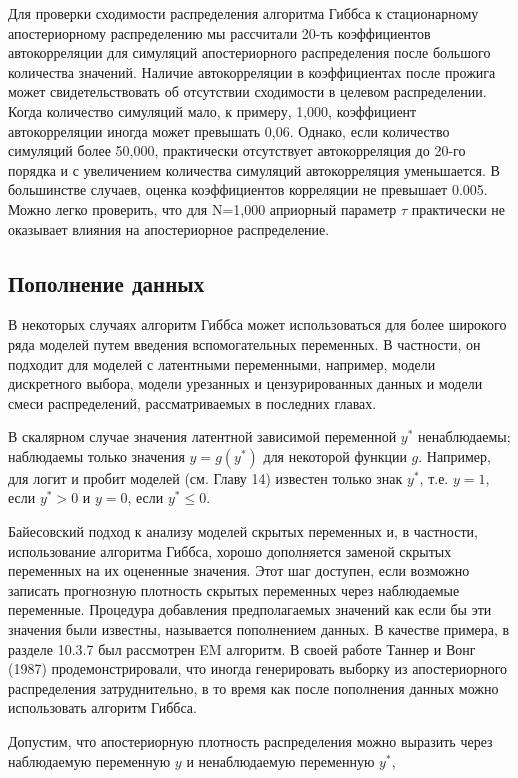 Для проверки сходимости распределения алгоритма Гиббса к стационарному апостериорному распределению мы рассчитали  20-ть коэффициентов автокорреляции для симуляций апостериорного распределения после большого количества значений. Наличие автокорреляции в коэффициентах после прожига может свидетельствовать об отсутствии сходимости в целевом распределении. Когда количество симуляций мало, к примеру, 1,000, коэффициент автокорреляции иногда может превышать 0,06. Однако, если количество симуляций более 50,000, практически отсутствует автокорреляция до 20-го порядка и с увеличением количества симуляций автокорреляция уменьшается. В большинстве случаев, оценка коэффициентов корреляции не превышает 0.005. Можно легко проверить, что для N=1,000  априорный параметр $\tau$ практически не оказывает влияния на апостериорное распределение.


\subsection{Пополнение данных}

В некоторых случаях алгоритм Гиббса может использоваться для более широкого ряда моделей путем введения вспомогательных переменных. В частности, он подходит для моделей с латентными переменными, например, модели дискретного выбора,  модели урезанных и цензурированных данных и модели  смеси распределений, рассматриваемых в последних главах.

В скалярном случае значения латентной зависимой переменной $y^{*}$ ненаблюдаемы; наблюдаемы только значения $y=g(y^{*})$ для  некоторой функции $g$. %
 Например, для логит и пробит моделей (см. Главу 14) известен только знак $y^{*}$, т.е. $y=1$, если $y^{*}>0$ и $y=0$, если $y^{*}{\leq}0$. 

Байесовский подход к анализу моделей скрытых переменных и, в частности, использование алгоритма Гиббса, хорошо дополняется заменой скрытых переменных на их оцененные  значения. 
Этот шаг доступен, если возможно записать прогнозную плотность скрытых переменных через наблюдаемые переменные. Процедура добавления предполагаемых значений как если бы эти значения были известны, называется пополнением данных. В качестве примера, в разделе 10.3.7 был рассмотрен EM алгоритм. В своей работе Таннер и Вонг (1987) продемонстрировали, что иногда генерировать выборку из апостериорного распределения затруднительно, в то время как после пополнения данных можно использовать алгоритм Гиббса.

Допустим, что апостериорную плотность распределения можно выразить через наблюдаемую переменную $y$ и ненаблюдаемую переменную $y^{*}$,

